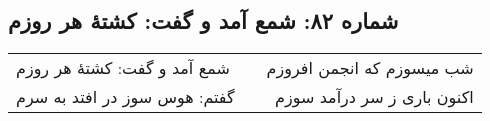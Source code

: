 \begin{center}
\section*{شماره ۸۲: شمع آمد و گفت: کشتۀ هر روزم}
\label{sec:082}
\begin{longtable}{l p{0.5cm} r}
شمع آمد و گفت: کشتهٔ هر روزم
&&
شب میسوزم که انجمن افروزم
\\
گفتم: هوس سوز در افتد به سرم
&&
اکنون باری ز سر درآمد سوزم
\\
\end{longtable}
\end{center}
